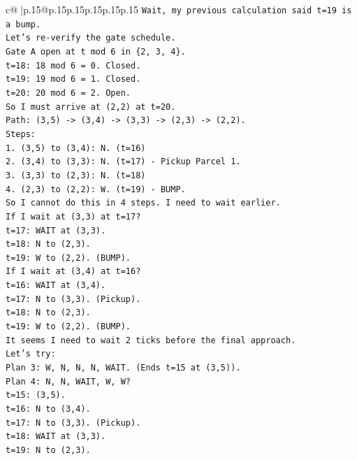 \documentclass{article}
\begin{document}
{\begin{supertabular}{c@{$\;$}|p{.15\linewidth}@{}p{.15\linewidth}p{.15\linewidth}p{.15\linewidth}p{.15\linewidth}p{.15\linewidth}}
{{{\texttt{Wait, my previous calculation said t=19 is a bump.} \\
\texttt{Let's re{-}verify the gate schedule.} \\
\texttt{Gate A open at t mod 6 in \{2, 3, 4\}.} \\
\texttt{t=18: 18 mod 6 = 0. Closed.} \\
\texttt{t=19: 19 mod 6 = 1. Closed.} \\
\texttt{t=20: 20 mod 6 = 2. Open.} \\
\texttt{So I must arrive at (2,2) at t=20.} \\
\texttt{Path: (3,5) {-}> (3,4) {-}> (3,3) {-}> (2,3) {-}> (2,2).} \\
\texttt{Steps:} \\
\texttt{1. (3,5) to (3,4): N. (t=16)} \\
\texttt{2. (3,4) to (3,3): N. (t=17) {-} Pickup Parcel 1.} \\
\texttt{3. (3,3) to (2,3): N. (t=18)} \\
\texttt{4. (2,3) to (2,2): W. (t=19) {-} BUMP.} \\
\texttt{So I cannot do this in 4 steps. I need to wait earlier.} \\
\texttt{If I wait at (3,3) at t=17?} \\
\texttt{t=17: WAIT at (3,3).} \\
\texttt{t=18: N to (2,3).} \\
\texttt{t=19: W to (2,2). (BUMP).} \\
\texttt{If I wait at (3,4) at t=16?} \\
\texttt{t=16: WAIT at (3,4).} \\
\texttt{t=17: N to (3,3). (Pickup).} \\
\texttt{t=18: N to (2,3).} \\
\texttt{t=19: W to (2,2). (BUMP).} \\
\texttt{It seems I need to wait 2 ticks before the final approach.} \\
\texttt{Let's try:} \\
\texttt{Plan 3: W, N, N, N, WAIT. (Ends t=15 at (3,5)).} \\
\texttt{Plan 4: N, N, WAIT, W, W?} \\
\texttt{t=15: (3,5).} \\
\texttt{t=16: N to (3,4).} \\
\texttt{t=17: N to (3,3). (Pickup).} \\
\texttt{t=18: WAIT at (3,3).} \\
\texttt{t=19: N to (2,3).} \\
}}}
\end{supertabular}}
\end{document}

